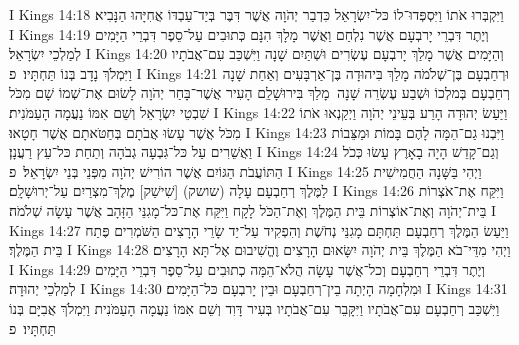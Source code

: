 I Kings 14:18	וַיִּקְבְּרוּ אֹתוֹ וַיִּסְפְּדוּ־לוֹ כּל־יִשְׂרָאֵל כִּדְבַר יְהֹוָה אֲשֶׁר דִּבֶּר בְּיַד־עַבְדּוֹ אֲחִיָּהוּ הַנָּבִיא׃
I Kings 14:19	וְיֶתֶר דִּבְרֵי יָרבְעָם אֲשֶׁר נִלְחַם וַאֲשֶׁר מָלָךְ הִנָּם כְּתוּבִים עַל־סֵפֶר דִּבְרֵי הַיָּמִים לְמַלְכֵי יִשְׂרָאֵל׃
I Kings 14:20	וְהַיָּמִים אֲשֶׁר מָלַךְ יָרבְעָם עֶשְׂרִים וּשְׁתַּיִם שָׁנָה וַיִּשְׁכַּב עִם־אֲבֹתָיו וַיִּמְלֹךְ נָדָב בְּנוֹ תַּחְתָּיו׃ {פ}
I Kings 14:21	וּרְחַבְעָם בֶּן־שְׁלֹמֹה מָלַךְ בִּיהוּדָה בֶּן־אַרְבָּעִים וְאַחַת שָׁנָה רְחַבְעָם בְּמלְכוֹ וּשְׁבַע עֶשְׂרֵה שָׁנָה  מָלַךְ בִּירוּשָׁלַ͏ִם הָעִיר אֲשֶׁר־בָּחַר יְהֹוָה לָשׂוּם אֶת־שְׁמוֹ שָׁם מִכֹּל שִׁבְטֵי יִשְׂרָאֵל וְשֵׁם אִמּוֹ נַעֲמָה הָעַמֹּנִית׃
I Kings 14:22	וַיַּעַשׂ יְהוּדָה הָרַע בְּעֵינֵי יְהֹוָה וַיְקַנְאוּ אֹתוֹ מִכֹּל אֲשֶׁר עָשׂוּ אֲבֹתָם בְּחַטֹּאתָם אֲשֶׁר חָטָאוּ׃
I Kings 14:23	וַיִּבְנוּ גַם־הֵמָּה לָהֶם בָּמוֹת וּמַצֵּבוֹת וַאֲשֵׁרִים עַל כּל־גִּבְעָה גְבֹהָה וְתַחַת כּל־עֵץ רַעֲנָן׃
I Kings 14:24	וְגַם־קָדֵשׁ הָיָה בָאָרֶץ עָשׂוּ כְּכֹל הַתּוֹעֲבֹת הַגּוֹיִם אֲשֶׁר הוֹרִישׁ יְהֹוָה מִפְּנֵי בְּנֵי יִשְׂרָאֵל׃ {פ}
I Kings 14:25	וַיְהִי בַּשָּׁנָה הַחֲמִישִׁית לַמֶּלֶךְ רְחַבְעָם עָלָה (שושק) [שִׁישַׁק] מֶלֶךְ־מִצְרַיִם עַל־יְרוּשָׁלָ͏ִם׃
I Kings 14:26	וַיִּקַּח אֶת־אֹצְרוֹת בֵּית־יְהֹוָה וְאֶת־אוֹצְרוֹת בֵּית הַמֶּלֶךְ וְאֶת־הַכֹּל לָקָח וַיִּקַּח אֶת־כּל־מָגִנֵּי הַזָּהָב אֲשֶׁר עָשָׂה שְׁלֹמֹה׃
I Kings 14:27	וַיַּעַשׂ הַמֶּלֶךְ רְחַבְעָם תַּחְתָּם מָגִנֵּי נְחֹשֶׁת וְהִפְקִיד עַל־יַד שָׂרֵי הָרָצִים הַשֹּׁמְרִים פֶּתַח בֵּית הַמֶּלֶךְ׃
I Kings 14:28	וַיְהִי מִדֵּי־בֹא הַמֶּלֶךְ בֵּית יְהֹוָה יִשָּׂאוּם הָרָצִים וֶהֱשִׁיבוּם אֶל־תָּא הָרָצִים׃
I Kings 14:29	וְיֶתֶר דִּבְרֵי רְחַבְעָם וְכל־אֲשֶׁר עָשָׂה הֲלֹא־הֵמָּה כְתוּבִים עַל־סֵפֶר דִּבְרֵי הַיָּמִים לְמַלְכֵי יְהוּדָה׃
I Kings 14:30	וּמִלְחָמָה הָיְתָה בֵין־רְחַבְעָם וּבֵין יָרבְעָם כּל־הַיָּמִים׃
I Kings 14:31	וַיִּשְׁכַּב רְחַבְעָם עִם־אֲבֹתָיו וַיִּקָּבֵר עִם־אֲבֹתָיו בְּעִיר דָּוִד וְשֵׁם אִמּוֹ נַעֲמָה הָעַמֹּנִית וַיִּמְלֹךְ אֲבִיָּם בְּנוֹ תַּחְתָּיו׃ {פ}
